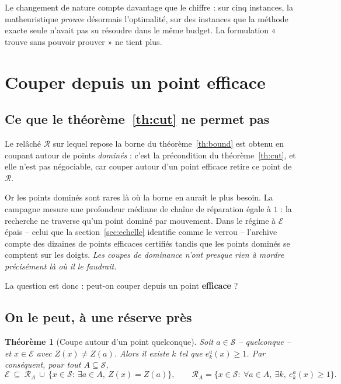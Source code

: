 \documentclass[11pt,a4paper]{article}
\theoremstyle{plain}
\newtheorem{theorem}{Théorème}
\theoremstyle{remark}
\newcommand{\Ecal}{\mathcal{E}}
\newcommand{\Scal}{\mathcal{S}}
\newcommand{\Rcal}{\mathcal{R}}
\begin{document}
\noindent
Le changement de nature compte davantage que le chiffre : sur cinq instances,
la matheuristique \emph{prouve} désormais l'optimalité, sur des instances que
la méthode exacte seule n'avait pas su résoudre dans le même budget. La
formulation « trouve sans pouvoir prouver » ne tient plus.

\section{Couper depuis un point efficace}
\label{sec:archcut}

\subsection{Ce que le théorème~\ref{th:cut} ne permet pas}

Le relâché $\Rcal$ sur lequel repose la borne du théorème~\ref{th:bound} est
obtenu en coupant autour de points \emph{dominés} : c'est la précondition du
théorème~\ref{th:cut}, et elle n'est pas négociable, car couper autour d'un
point efficace retire ce point de $\Rcal$.

Or les points dominés sont rares là où la borne en aurait le plus besoin. La
campagne mesure une profondeur médiane de chaîne de réparation égale à $1$ :
la recherche ne traverse qu'un point dominé par mouvement. Dans le régime à
$\Ecal$ épais -- celui que la section~\ref{sec:echelle} identifie comme le
verrou -- l'archive compte des dizaines de points efficaces certifiés tandis
que les points dominés se comptent sur les doigts. \emph{Les coupes de
dominance n'ont presque rien à mordre précisément là où il le faudrait.}

La question est donc : peut-on couper depuis un point \textbf{efficace} ?

\subsection{On le peut, à une réserve près}

\begin{theorem}[Coupe autour d'un point quelconque]\label{th:effcut}
Soit $a\in\Scal$ -- \emph{quelconque} -- et $x\in\Ecal$ avec
$Z(x)\ne Z(a)$. Alors il existe $k$ tel
que $e^a_k(x)\ge 1$. Par conséquent, pour tout $A\subseteq\Scal$,
\[
  \Ecal\ \subseteq\ \Rcal_A\ \cup\ \bigl\{x\in\Scal:\ \exists a\in A,\ Z(x)=Z(a)\bigr\},
  \qquad
  \Rcal_A=\bigl\{x\in\Scal:\ \forall a\in A,\ \exists k,\ e^a_k(x)\ge 1\bigr\}.
\]
\end{theorem}
\end{document}
